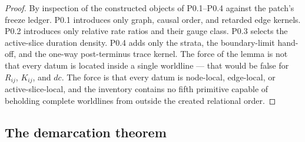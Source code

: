 \documentclass[11pt,a4paper]{article}
\def\mathfrak#1{#1}%
\theoremstyle{definition}
\theoremstyle{plain}
\theoremstyle{remark}
\begin{document}
\begin{proof}
By inspection of the constructed objects of P0.1--P0.4 against the patch's freeze ledger.
P0.1 introduces only graph, causal order, and retarded edge kernels. P0.2 introduces only
relative rate ratios and their gauge class. P0.3 selects the active-slice duration
density. P0.4 adds only the strata, the boundary-limit hand-off, and the one-way
post-terminus trace kernel. The force of the lemma is not that every datum is located
inside a single worldline --- that would be false for \(R_{ij}\), \(K_{ij}\), and
\(d\mathfrak c\). The force is that every datum is node-local, edge-local, or
active-slice-local, and the inventory contains no fifth primitive capable of beholding
complete worldlines from outside the created relational order. \qedhere
\end{proof}

\subsection{The demarcation theorem}
\end{document}
